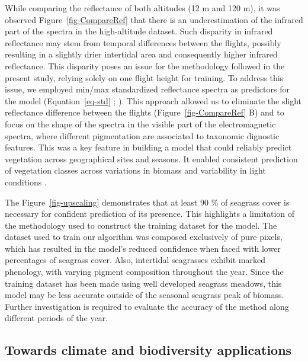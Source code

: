 \documentclass[
  number]{elsarticle}
\begin{document}
While comparing the reflectance of both altitudes (12 m and 120 m), it
was observed Figure~\ref{fig-CompareRef} that there is an
underestimation of the infrared part of the spectra in the high-altitude
dataset. Such disparity in infrared reflectance may stem from temporal
differences between the flights, possibly resulting in a slightly drier
intertidal area and consequently higher infrared reflectance. This
disparity poses an issue for the methodology followed in the present
study, relying solely on one flight height for training. To address this
issue, we employed min/max standardized reflectance spectra as
predictors for the model (Equation~\ref{eq-std} ; \citep{Cao2017}). This
approach allowed us to eliminate the slight reflectance difference
between the flights (Figure~\ref{fig-CompareRef} B) and to focus on the
shape of the spectra in the visible part of the electromagnetic spectra,
where different pigmentation are associated to taxonomic dignostic
features. This was a key feature in building a model that could reliably
predict vegetation across geographical sites and seasons. It enabled
consistent prediction of vegetation classes across variations in biomass
and variability in light conditions \citetext{\citealp[
]{fyfe2003spatial}; \citealp[
]{COSTA2021107018}; \citealp{piaser2023impact}}.

The Figure~\ref{fig-upscaling} demonstrates that at least 90 \% of
seagrass cover is necessary for confident prediction of its presence.
This highlights a limitation of the methodology used to construct the
training dataset for the model. The dataset used to train our algorithm
was composed exclusively of pure pixels, which has resulted in the
model's reduced confidence when faced with lower percentages of seagrass
cover. Also, intertidal seagrasses exhibit marked phenology, with
varying pigment composition throughout the year\citetext{\citealp[
]{bargain2013seasonal}; \citealp{legare2022remote}}. Since the training
dataset has been made using well developed seagrass meadows, this model
may be less accurate outside of the seasonal seagrass peak of biomass.
Further investigation is required to evaluate the accuracy of the method
along different periods of the year.

\subsection{Towards climate and biodiversity
applications}\label{towards-climate-and-biodiversity-applications}
\end{document}
